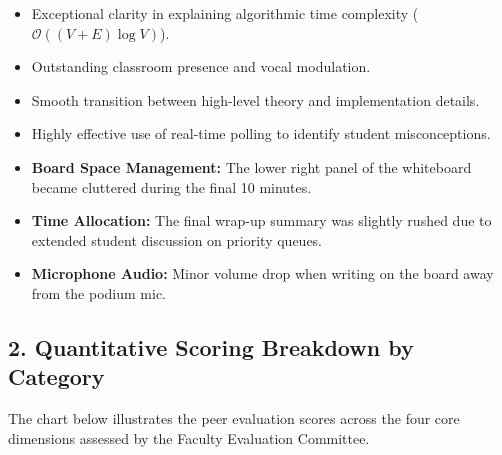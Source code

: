 \documentclass[10pt,a4paper]{article}
\begin{document}
\begin{minipage}[t]{0.48\textwidth}
  \begin{strengthbox}
    \small
    \begin{itemize}[leftmargin=12pt, label={\color{GreenPass}\faCheck}]
      \item Exceptional clarity in explaining algorithmic time complexity ($\mathcal{O}((V + E) \log V)$).
      \item Outstanding classroom presence and vocal modulation.
      \item Smooth transition between high-level theory and implementation details.
      \item Highly effective use of real-time polling to identify student misconceptions.
    \end{itemize}
  \end{strengthbox}
\end{minipage}%
\hfill
\begin{minipage}[t]{0.48\textwidth}
  \begin{growthbox}
    \small
    \begin{itemize}[leftmargin=12pt, label={\color{AmberWarn}\faExclamation}]
      \item \textbf{Board Space Management:} The lower right panel of the whiteboard became cluttered during the final 10 minutes.
      \item \textbf{Time Allocation:} The final wrap-up summary was slightly rushed due to extended student discussion on priority queues.
      \item \textbf{Microphone Audio:} Minor volume drop when writing on the board away from the podium mic.
    \end{itemize}
  \end{growthbox}
\end{minipage}

\vspace{14pt}

\subsection{2. Quantitative Scoring Breakdown by Category}

The chart below illustrates the peer evaluation scores across the four core dimensions assessed by the Faculty Evaluation Committee.

\vspace{6pt}
\end{document}
